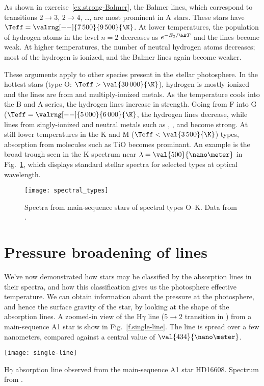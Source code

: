 As shown in exercise~\ref{ex.strong-Balmer}, the Balmer lines, which correspond to transitions $2\to3$, $2\to 4$, \ldots, are most prominent in A stars. These stars have $\Teff = \valrng[--]{7\,500}{9\,500}{\K}$. At lower temperatures, the population of hydrogen atoms in the level $n=2$ decreases as $e^{-E_{2}/\kB T}$ and the lines become weak. At higher temperatures, the number of neutral hydrogen atoms decreases; most of the hydrogen is ionized, and the Balmer lines again become weaker.

These arguments apply to other species present in the stellar photosphere.  In the hottest stars (type O: $\Teff > \val{30\,000}{\K}$), hydrogen is mostly ionized and the lines are from  and multiply-ionized metals. As the temperature cools into the B and A series, the hydrogen lines increase in strength. Going from F into G ($\Teff = \valrng[--]{5\,000}{6\,000}{\K}$, the hydrogen lines decrease, while lines from singly-ionized and neutral metals such as , , and  become strong.  At still lower temperatures in the K and M ($\Teff < \val{3\,500}{\K}$) types, absorption from molecules such as TiO becomes prominant.  An example is the broad trough seen in the K spectrum near $\lambda = \val{500}{\nano\meter}$ in Fig.~\ref{f.spectral-types}, which displays standard stellar spectra for selected types at optical wavelength.

\begin{figure}[hbp]
\texttt{[image: spectral\_types]}
\caption[Standard stellar types]{\label{f.spectral-types} Spectra from main-sequence stars of spectral types O--K. Data from \protect\citet{Jacoby1984A-library-of-st}.}
\end{figure}

\section{Pressure broadening of lines}

We've now demonstrated how stars may be classified by the absorption lines in their spectra, and how this classification gives us the photosphere effective temperature. We can obtain information about the pressure at the photosphere, and hence the surface gravity of the star, by looking at the shape of the absorption lines. A zoomed-in view of the H$\gamma$ line ($5\to2$ transition in ) from a main-sequence A1 star is show in Fig.~\ref{f.single-line}. The line is spread over a few nanometers, compared against a central value of $\val{434}{\nano\meter}$.
\begin{marginfigure}
\texttt{[image: single-line]}
\caption{\label{f.single-line} H$\gamma$ absorption line observed from the main-sequence A1 star HD16608. Spectrum from \protect\citet{Jacoby1984A-library-of-st}.}
\end{marginfigure}

